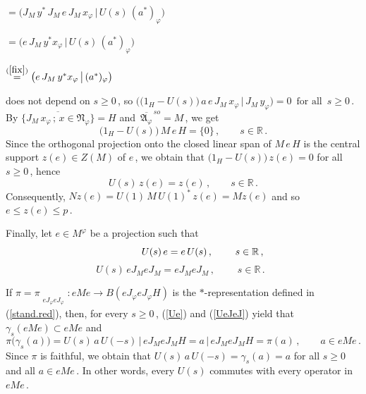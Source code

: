 \documentclass[reqno]{amsart}
\theoremstyle{definition}
\theoremstyle{remark}
\numberwithin{equation}{section}
\theoremstyle{plain}
\begin{document}
\noindent\hspace{4.035 cm} $=\big( J_M\, y^*\, J_M\, e\, J_M\,
x_\varphi\,\big|\, U(s)\, (a^*)_\varphi\big)$
\smallskip

\noindent\hspace{4.035 cm} $=\big( e\, J_M\, y^* x_\varphi\,\big|
\, U(s)\, (a^*)_\varphi\big)$
\smallskip

\noindent\hspace{3.88 cm} $\overset{(\ref{fix})}{=}\big( e\, J_M\,
y^* x_\varphi\,\big|\, (a^*)_\varphi\big)$
\smallskip

\noindent does not depend on $s\geq 0\,$, so
$\big( \big( 1_H -U(s)\big)\, a\, e\, J_M\, x_\varphi\,\big|
\, J_M\, y_\varphi\big) =0\,\text{ for all }\, s\geq 0\,$. By
$\overline{\{ J_M\, x_\varphi\, ;\, x\in\mathfrak N_\varphi\} }
=H$ and $\,\overline{\mathfrak A_\varphi }^{\, so}=M\,$, we get
\begin{equation*}
\big( 1_H-U(s)\big)\, M\, e\, H=\{ 0\}\, ,\qquad s\in\mathbb R\, .
\end{equation*}
Since the orthogonal projection onto the closed linear span of
$M\, e\, H$ is the central support $z(e)\in Z(M)$ of $e\,$, we
obtain that $\big( 1_H-U(s)\big)\, z(e)=0$ for all $s\geq 0\,$,
hence
\begin{equation*}
U(s)\, z(e) =z(e)\, ,\qquad s\in\mathbb R\, .
\end{equation*}
Consequently, $N z(e) =U(1)\, M\, U(1)^*\, z(e) =M z(e)$ and so
$e\leq z(e)\leq p\,$.

Finally, let $e\in M^\varphi$ be a projection such that
\begin{equation}\label{Ue} \hspace{1.39 cm}
U(s)\, e =e\, U(s)\, ,\qquad\; s\in\mathbb R\, ,
\end{equation}
\begin{equation}\label{UeJeJ}
U(s)\, e J_M e J_M =e J_M e J_M\, ,\qquad\; s\in\mathbb R\, .
\phantom{x}
\end{equation}

If $\pi =\pi_{\substack{{}\\ e J_\varphi e J_\varphi}} :
e M e\longrightarrow B(e J_\varphi e J_\varphi H)$ is the
$*$-representation defined in (\ref{stand.red}), then, for every
$s\geq 0\,$, (\ref{Ue}) and (\ref{UeJeJ}) yield that
$\gamma_s (eMe)\subset eMe$ and
\begin{equation*}
\pi\big( \gamma_s (a)\big) =U(s)\, a\, U(-s)\, |\, e J_M e J_M H
=a\, |\, e J_M e J_M H =\pi (a)\, ,\qquad a\in eMe\, .
\end{equation*}
Since $\pi$ is faithful, we obtain that $U(s)\, a\, U(-s) =
\gamma_s (a) =a$ for all $s\geq 0$ and all $a\in eMe\,$. In other
words, every $U(s)$ commutes with every operator in $eMe\,$.  
\end{document}
